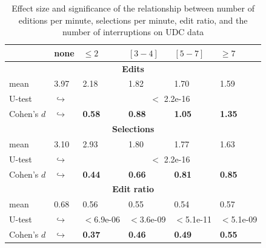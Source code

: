 \documentclass[times]{smrauth}
\begin{document}
\begin{table}[ht!]
	\tiny
	\renewcommand{\arraystretch}{1.3}
	\caption{Effect size and significance of the relationship between number of editions per minute, selections per minute, edit ratio, and the number of interruptions on UDC data} 
	\label{tbl:p_value_udc}
	\centering
	\begin{tabular}{l | p{0.75cm} | p{1.2cm} | p{1.2cm} | p{1.2cm} |p{1.2cm}} 
		
		& none & $\leq 2$ & $[3 - 4]$ & $[5 - 7]$ & $\geq 7$  \\  
		\hline
		\multicolumn{6}{c}{\textbf{Edits}} \\
		\hline
		mean & 3.97 &	2.18 & 1.82 & 1.70 & 1.59 \\ 
		\cline{3-6} 
		U-test & $\hookrightarrow$ & \multicolumn{4}{c}{$<$ 2.2e-16} \\
		\cline{3-6} 
		Cohen's $d$ & $\hookrightarrow$	& \textbf{0.58} & \textbf{0.88} & \textbf{1.05} & \textbf{1.35}    \\
		\hline
		
		
		\multicolumn{6}{c}{\textbf{Selections}} \\
		\hline 
		mean & 3.10 &	2.93 & 1.80 & 1.77 & 1.63  \\ 
		\cline{3-6} 
		U-test & $\hookrightarrow$ & \multicolumn{4}{c}{$<$ 2.2e-16} \\
		
		\cline{3-6} 
		Cohen's $d$ & $\hookrightarrow$	& \textbf{0.44} & \textbf{0.66} & \textbf{0.81} & \textbf{0.85} \\  
		\hline
		
		
		\multicolumn{6}{c}{\textbf{Edit ratio}} \\
		\hline 
		mean & 0.68 & 0.56 & 0.55 & 0.54 & 0.57 \\ 
		\cline{3-6} 
		\cline{3-6} 
		U-test & $\hookrightarrow$ & $<$6.9e-06 & $<$3.6e-09 & $<$5.1e-11 & $<$5.1e-09  \\
		\cline{3-6} 
		Cohen's $d$ & $\hookrightarrow$ & \textbf{0.37} & \textbf{0.46} & \textbf{0.49} & \textbf{0.55} \\ 
		\hline
		
	\end{tabular}
\end{table}
\end{document}
